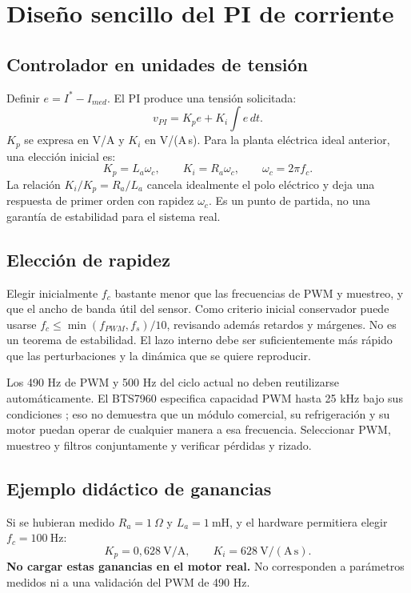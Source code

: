 \documentclass[11pt,a4paper]{article}
\begin{document}
\section{Diseño sencillo del PI de corriente}
\subsection{Controlador en unidades de tensión}
Definir $e=I^*-I_{med}$. El PI produce una tensión solicitada:
\begin{equation}
v_{PI}=K_pe+K_i\int e\,dt.
\end{equation}
$K_p$ se expresa en V/A y $K_i$ en V/(A\,s). Para la planta eléctrica ideal anterior, una elección inicial es:
\begin{equation}
\boxed{K_p=L_a\omega_c,\qquad K_i=R_a\omega_c,\qquad \omega_c=2\pi f_c.}
\end{equation}
La relación $K_i/K_p=R_a/L_a$ cancela idealmente el polo eléctrico y deja una respuesta de primer orden con rapidez $\omega_c$. Es un punto de partida, no una garantía de estabilidad para el sistema real.

\subsection{Elección de rapidez}
Elegir inicialmente $f_c$ bastante menor que las frecuencias de PWM y muestreo, y que el ancho de banda útil del sensor. Como criterio inicial conservador puede usarse $f_c\leq\min(f_{PWM},f_s)/10$, revisando además retardos y márgenes. No es un teorema de estabilidad. El lazo interno debe ser suficientemente más rápido que las perturbaciones y la dinámica que se quiere reproducir.

Los 490 Hz de PWM y 500 Hz del ciclo actual no deben reutilizarse automáticamente. El BTS7960 especifica capacidad PWM hasta 25 kHz bajo sus condiciones \cite{bts}; eso no demuestra que un módulo comercial, su refrigeración y su motor puedan operar de cualquier manera a esa frecuencia. Seleccionar PWM, muestreo y filtros conjuntamente y verificar pérdidas y rizado.

\subsection{Ejemplo didáctico de ganancias}
Si se hubieran medido $R_a=1\ \Omega$ y $L_a=1\ \mathrm{mH}$, y el hardware permitiera elegir $f_c=100\ \mathrm{Hz}$:
\begin{equation}
K_p=0{,}628\ \mathrm{V/A},\qquad
K_i=628\ \mathrm{V/(A\,s)}.
\end{equation}
\textbf{No cargar estas ganancias en el motor real.} No corresponden a parámetros medidos ni a una validación del PWM de 490 Hz.
\end{document}
